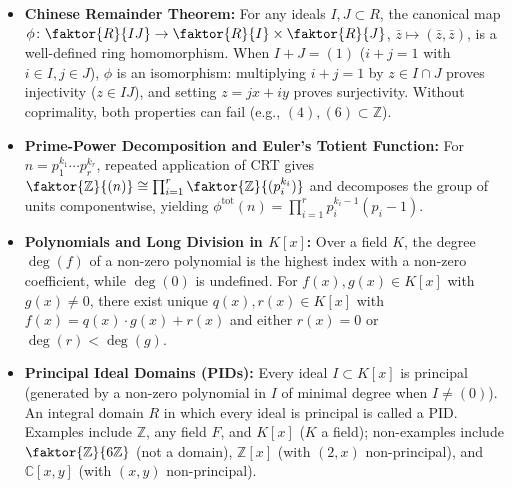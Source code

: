 \begin{overview}
\begin{itemize}
    \item \textbf{Chinese Remainder Theorem:} For any ideals $I, J \subset R$, the canonical map $\phi \colon \faktor{R}{IJ} \to \faktor{R}{I} \times \faktor{R}{J}$, $\bar{z} \mapsto (\bar{z}, \bar{z})$, is a well-defined ring homomorphism. When $I + J = (1)$ ($i + j = 1$ with $i \in I, j \in J$), $\phi$ is an isomorphism: multiplying $i + j = 1$ by $z \in I \cap J$ proves injectivity ($z \in IJ$), and setting $z = jx + iy$ proves surjectivity. Without coprimality, both properties can fail (e.g., $(4), (6) \subset \mathbb{Z}$).
    \item \textbf{Prime-Power Decomposition and Euler's Totient Function:} For $n = p_1^{k_1} \cdots p_r^{k_r}$, repeated application of CRT gives $\faktor{\mathbb{Z}}{(n)} \cong \prod_{i=1}^r \faktor{\mathbb{Z}}{(p_i^{k_i})}$ and decomposes the group of units componentwise, yielding $\phi^{\text{tot}}(n) = \prod_{i=1}^r p_i^{k_i - 1}(p_i - 1)$.
    \item \textbf{Polynomials and Long Division in $K[x]$:} Over a field $K$, the degree $\deg(f)$ of a non-zero polynomial is the highest index with a non-zero coefficient, while $\deg(0)$ is undefined. For $f(x), g(x) \in K[x]$ with $g(x) \neq 0$, there exist unique $q(x), r(x) \in K[x]$ with $f(x) = q(x) \cdot g(x) + r(x)$ and either $r(x) = 0$ or $\deg(r) < \deg(g)$.
    \item \textbf{Principal Ideal Domains (PIDs):} Every ideal $I \subset K[x]$ is principal (generated by a non-zero polynomial in $I$ of minimal degree when $I \neq (0)$). An integral domain $R$ in which every ideal is principal is called a PID. Examples include $\mathbb{Z}$, any field $F$, and $K[x]$ ($K$ a field); non-examples include $\faktor{\mathbb{Z}}{6\mathbb{Z}}$ (not a domain), $\mathbb{Z}[x]$ (with $(2, x)$ non-principal), and $\mathbb{C}[x, y]$ (with $(x, y)$ non-principal).
\end{itemize}
\end{overview}